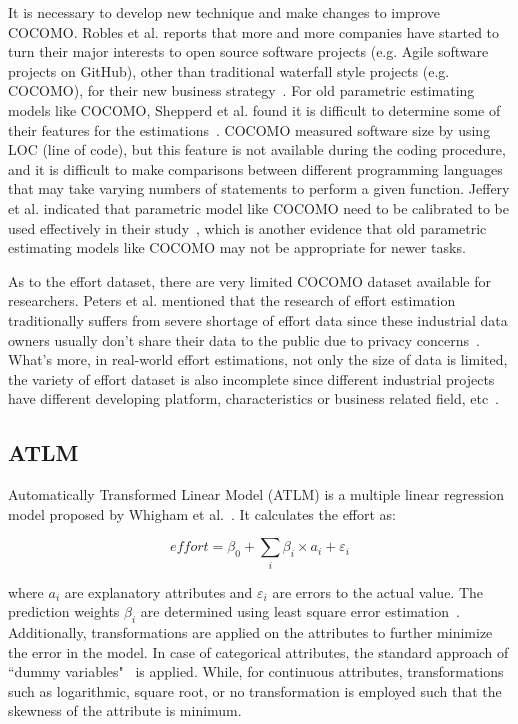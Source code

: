 \documentclass[sigconf,review]{acmart}
\begin{document}
It is necessary to develop new technique and make changes to improve COCOMO. Robles et al. reports that more and more companies have started to turn their major interests to open source software projects (e.g. Agile software projects on GitHub), other than traditional waterfall style projects (e.g. COCOMO), for their new business strategy~\cite{robles2014estimating}. For old parametric estimating models like COCOMO, Shepperd et al. found it is difficult to determine some of their features for the estimations~\cite{shepperd2007software}. COCOMO measured software size by using LOC (line of code), but this feature is not available during the coding procedure, and it is difficult to make comparisons between different programming languages that may take varying numbers of statements to perform a given function. Jeffery et al. indicated that parametric model like COCOMO need to be calibrated to be used effectively in their study~\cite{jeffery1990calibrating}, which is another evidence that old parametric estimating models like COCOMO may not be appropriate for newer tasks. 

As to the effort dataset, there are very limited COCOMO dataset available for researchers. Peters et al. mentioned that the research of effort estimation traditionally suffers from severe shortage of effort data since these industrial data owners usually don't share their data to the public due to privacy concerns~\cite{peters2012privacy}. What's more, in real-world effort estimations, not only the size of data is limited, the variety of effort dataset is also incomplete since different industrial projects have different developing platform, characteristics or business related field, etc~\cite{qi2017software}.


\subsection{ATLM}
\label{sec:atlm}
Automatically Transformed Linear Model (ATLM) is a multiple linear regression model proposed by Whigham et al.~\cite{Whigham:2015}. It calculates the effort as:

\[
\mathit{effort} = \beta_0 + \sum_i\beta_i\times a_{i} +  \varepsilon_i
\]

where $a_i$ are explanatory attributes and $\varepsilon_i$ are errors to the actual value. The prediction weights $\beta_i$ are determined using least square error estimation~\cite{neter1996applied}. Additionally, transformations are applied on the attributes to further minimize the error in the model. In case of categorical attributes, the standard approach of ``dummy variables"~\cite{hardy1993regression} is applied. While, for continuous attributes, transformations such as logarithmic, square root,  or no transformation is employed such that the skewness of the attribute is minimum. 
\end{document}
